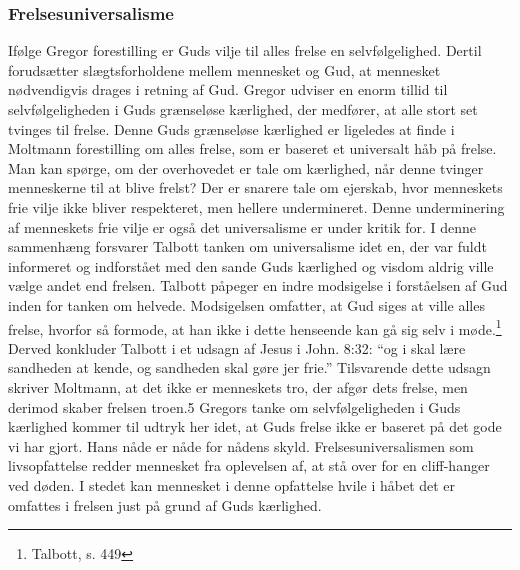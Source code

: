 \subsubsection{Frelsesuniversalisme}
Ifølge Gregor forestilling er Guds vilje til alles frelse en selvfølgelighed. Dertil forudsætter slægtsforholdene mellem mennesket og Gud, at mennesket nødvendigvis drages i retning af Gud. Gregor udviser en enorm tillid til selvfølgeligheden i Guds grænseløse kærlighed, der medfører, at alle stort set tvinges til frelse. Denne Guds grænseløse kærlighed er ligeledes at finde i Moltmann forestilling om alles frelse, som er baseret et universalt håb på frelse. Man kan spørge, om der overhovedet er tale om kærlighed, når denne tvinger menneskerne til at blive frelst? Der er snarere tale om ejerskab, hvor menneskets frie vilje ikke bliver respekteret, men hellere undermineret. Denne underminering af menneskets frie vilje er også det universalisme er under kritik for. I denne sammenhæng forsvarer Talbott tanken om universalisme idet en, der var fuldt informeret og indforstået med den sande Guds kærlighed og visdom aldrig ville vælge andet end frelsen. Talbott påpeger en indre modsigelse i forståelsen af Gud inden for tanken om helvede. Modsigelsen omfatter, at Gud siges at ville alles frelse, hvorfor så formode, at han ikke i dette henseende kan gå sig selv i møde.\footnote{Talbott, s. 449} Derved  konkluder Talbott i et udsagn af Jesus i John. 8:32: “og i skal lære sandheden at kende, og sandheden skal gøre jer frie.” Tilsvarende dette udsagn skriver Moltmann, at det ikke er menneskets tro, der afgør dets frelse, men derimod skaber frelsen troen.5 Gregors tanke om selvfølgeligheden i Guds kærlighed kommer til udtryk her idet, at Guds frelse ikke er baseret på det gode vi har gjort. Hans nåde er nåde for nådens skyld. Frelsesuniversalismen som livsopfattelse redder mennesket fra oplevelsen af, at stå over for en cliff-hanger ved døden. I stedet kan mennesket i denne opfattelse hvile i håbet det er omfattes i frelsen just på grund af Guds kærlighed.

